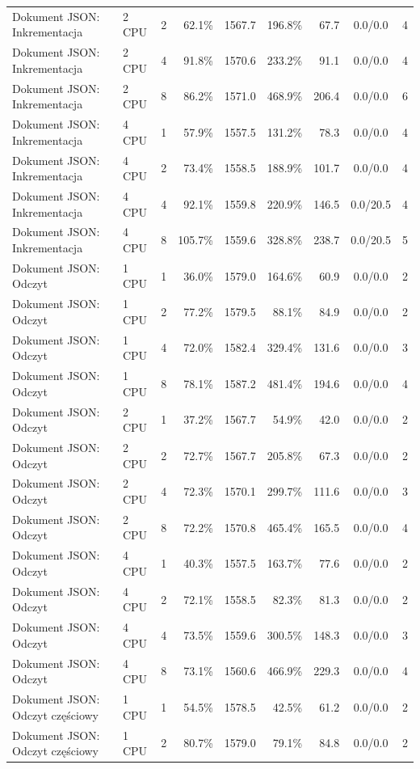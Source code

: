 \begin{table}[ht]
{\begin{tabular}{llcrrrrcc}
Dokument JSON: Inkrementacja & 2 CPU & 2 & 62.1\% & 1567.7 & 196.8\% & 67.7 & 0.0/0.0 & 4 \\
Dokument JSON: Inkrementacja & 2 CPU & 4 & 91.8\% & 1570.6 & 233.2\% & 91.1 & 0.0/0.0 & 4 \\
Dokument JSON: Inkrementacja & 2 CPU & 8 & 86.2\% & 1571.0 & 468.9\% & 206.4 & 0.0/0.0 & 6 \\
Dokument JSON: Inkrementacja & 4 CPU & 1 & 57.9\% & 1557.5 & 131.2\% & 78.3 & 0.0/0.0 & 4 \\
Dokument JSON: Inkrementacja & 4 CPU & 2 & 73.4\% & 1558.5 & 188.9\% & 101.7 & 0.0/0.0 & 4 \\
Dokument JSON: Inkrementacja & 4 CPU & 4 & 92.1\% & 1559.8 & 220.9\% & 146.5 & 0.0/20.5 & 4 \\
Dokument JSON: Inkrementacja & 4 CPU & 8 & 105.7\% & 1559.6 & 328.8\% & 238.7 & 0.0/20.5 & 5 \\
Dokument JSON: Odczyt & 1 CPU & 1 & 36.0\% & 1579.0 & 164.6\% & 60.9 & 0.0/0.0 & 2 \\
Dokument JSON: Odczyt & 1 CPU & 2 & 77.2\% & 1579.5 & 88.1\% & 84.9 & 0.0/0.0 & 2 \\
Dokument JSON: Odczyt & 1 CPU & 4 & 72.0\% & 1582.4 & 329.4\% & 131.6 & 0.0/0.0 & 3 \\
Dokument JSON: Odczyt & 1 CPU & 8 & 78.1\% & 1587.2 & 481.4\% & 194.6 & 0.0/0.0 & 4 \\
Dokument JSON: Odczyt & 2 CPU & 1 & 37.2\% & 1567.7 & 54.9\% & 42.0 & 0.0/0.0 & 2 \\
Dokument JSON: Odczyt & 2 CPU & 2 & 72.7\% & 1567.7 & 205.8\% & 67.3 & 0.0/0.0 & 2 \\
Dokument JSON: Odczyt & 2 CPU & 4 & 72.3\% & 1570.1 & 299.7\% & 111.6 & 0.0/0.0 & 3 \\
Dokument JSON: Odczyt & 2 CPU & 8 & 72.2\% & 1570.8 & 465.4\% & 165.5 & 0.0/0.0 & 4 \\
Dokument JSON: Odczyt & 4 CPU & 1 & 40.3\% & 1557.5 & 163.7\% & 77.6 & 0.0/0.0 & 2 \\
Dokument JSON: Odczyt & 4 CPU & 2 & 72.1\% & 1558.5 & 82.3\% & 81.3 & 0.0/0.0 & 2 \\
Dokument JSON: Odczyt & 4 CPU & 4 & 73.5\% & 1559.6 & 300.5\% & 148.3 & 0.0/0.0 & 3 \\
Dokument JSON: Odczyt & 4 CPU & 8 & 73.1\% & 1560.6 & 466.9\% & 229.3 & 0.0/0.0 & 4 \\
Dokument JSON: Odczyt częściowy & 1 CPU & 1 & 54.5\% & 1578.5 & 42.5\% & 61.2 & 0.0/0.0 & 2 \\
Dokument JSON: Odczyt częściowy & 1 CPU & 2 & 80.7\% & 1579.0 & 79.1\% & 84.8 & 0.0/0.0 & 2 \\

\end{tabular}}
\end{table}
